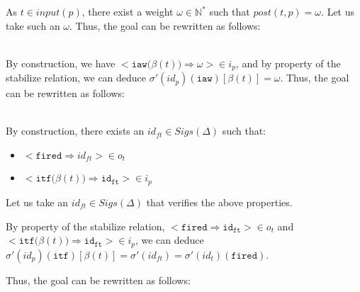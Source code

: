 \documentclass[dvipsnames,12pt]{article}
\begin{document}
\begin{niproof}
\begin{itemize}
\begin{enumerate}
          As $t\in{}input(p)$, there exist a weight
          $\omega\in\mathbb{N}^{*}$ such that $post(t,p)=\omega$. Let
          us take such an $\omega$. Thus, the goal can be rewritten as
          follows:
          
          \\
          
          By construction, we have
          ${<}\mathtt{iaw(}\beta(t)\mathtt{)\Rightarrow{}}\omega{>}\in{}i_p$,
          and by property of the stabilize relation, we can deduce
          $\sigma'(id_p)(\texttt{iaw})[\beta(t)]=\omega$. Thus, the
          goal can be rewritten as follows:

          \\
          
          By construction, there exists an $id_{ft}\in{}Sigs(\Delta)$
          such that:
          \begin{itemize}
          \item ${<}\mathtt{fired\Rightarrow}id_{ft}{>}\in{}o_t$
          \item
            ${<}\mathtt{itf(}\beta(t)\mathtt{)\Rightarrow{}id_{ft}}{>}\in{}i_p$
          \end{itemize}
          
          Let us take an $id_{ft}\in{}Sigs(\Delta)$ that verifies the
          above properties.
          
          By property of the stabilize relation,
          ${<}\mathtt{fired\Rightarrow{}id_{ft}}{>}\in{}o_t$ and
          ${<}\mathtt{itf(}\beta(t)\mathtt{)\Rightarrow{}id_{ft}}{>}\in{}i_p$,
          we can deduce
          $\sigma'(id_p)(\texttt{itf})[\beta(t)]=\sigma'(id_{ft})=\sigma'(id_t)(\texttt{fired})$.

          Thus, the goal can be rewritten as follows:


\end{enumerate}
\end{itemize}
\end{niproof}
\end{document}
